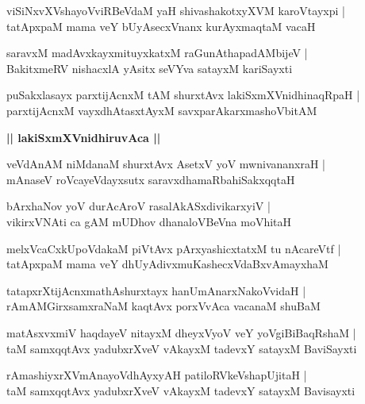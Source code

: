 \documentclass[twoside,12pt,openright]{book}
\newcounter{shloka}[chapter]
\def\uvaca#1{\centerline{{\large\textbf{#1}}}}
\begin{document}
\begin{shloka}%
viSiNxvXVshayoVviRBeVdaM yaH shivashakotxyXVM karoVtayxpi |\\
tatApxpaM mama veY bUyAsecxVnanx kurAyxmaqtaM vacaH
\end{shloka}

\begin{shloka}%
saravxM madAvxkayxmituyxkatxM raGunAthapadAMbijeV |\\
BakitxmeRV nishacxlA yAsitx seVYva satayxM kariSayxti 
\end{shloka}

\begin{shloka}%
puSakxlasayx parxtijAcnxM tAM shurxtAvx lakiSxmXVnidhinaqRpaH |\\
parxtijAcnxM vayxdhAtasxtAyxM savxparAkarxmashoVbitAM 
\end{shloka}

\uvaca{|| lakiSxmXVnidhiruvAca ||}

\begin{shloka}%
veVdAnAM niMdanaM shurxtAvx AsetxV yoV mwnivananxraH |\\
mAnaseV roVcayeVdayxsutx saravxdhamaRbahiSakxqqtaH 
\end{shloka}

\begin{shloka}%
bArxhaNov yoV durAcAroV rasalAkASxdivikarxyiV |\\
vikirxVNAti ca gAM  mUDhov dhanaloVBeVna moVhitaH 
\end{shloka}

\begin{shloka}%
melxVcaCxkUpoVdakaM piVtAvx pArxyashicxtatxM tu nAcareVtf |\\
tatApxpaM mama veY dhUyAdivxmuKashecxVdaBxvAmayxhaM 
\end{shloka}

\begin{shloka}%
tatapxrXtijAcnxmathAshurxtayx hanUmAnarxNakoVvidaH |\\
rAmAMGirxsamxraNaM kaqtAvx porxVvAca vacanaM shuBaM 
\end{shloka}

\begin{shloka}%
matAsxvxmiV haqdayeV nitayxM dheyxVyoV veY yoVgiBiBaqRshaM |\\
taM samxqqtAvx yadubxrXveV vAkayxM tadevxY satayxM BaviSayxti
\end{shloka}

\begin{shloka}%
rAmashiyxrXVmAnayoVdhAyxyAH patiloRVkeVshapUjitaH |\\
taM samxqqtAvx yadubxrXveV vAkayxM tadevxY satayxM Bavisayxti  
\end{shloka}
\end{document}
